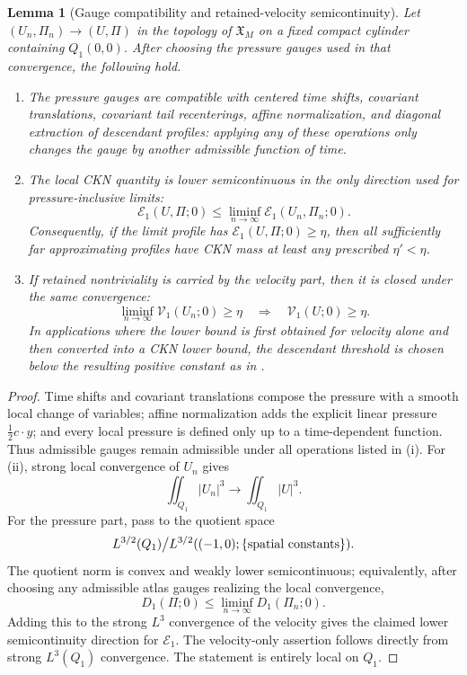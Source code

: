\documentclass[11pt]{amsart}
\numberwithin{equation}{section}
\theoremstyle{plain}
\newtheorem{lemma}[lemma]{Lemma}
\theoremstyle{definition}
\theoremstyle{remark}
\newcommand{\calE}{\mathcal E}
\newcommand{\Vel}{\mathcal V}
\begin{document}
\begin{lemma}[Gauge compatibility and retained-velocity semicontinuity]
\label{lem:gauge-compatibility}
Let \((U_n,\Pi_n)\to(U,\Pi)\) in the topology of
\(\mathfrak X_M\) on a fixed compact cylinder containing \(Q_1(0,0)\).  After
choosing the pressure gauges used in that convergence, the following hold.
\begin{enumerate}[label=\textup{(\roman*)}]
   \item The pressure gauges are compatible with centered time shifts,
   covariant translations, covariant tail recenterings, affine normalization,
   and diagonal extraction of descendant profiles: applying any of these operations only
   changes the gauge by another admissible function of time.
   \item The local CKN quantity is lower semicontinuous in the only direction
   used for pressure-inclusive limits:
   \[
      \calE_1(U,\Pi;0)
      \le
      \liminf_{n\to\infty}\calE_1(U_n,\Pi_n;0).
   \]
   Consequently, if the limit profile has
   \(\calE_1(U,\Pi;0)\ge\eta\), then all sufficiently far approximating
   profiles have CKN mass at least any prescribed \(\eta'<\eta\).
   \item If retained nontriviality is carried by the velocity part, then it is
   closed under the same convergence:
   \[
      \liminf_{n\to\infty}\Vel_1(U_n;0)\ge\eta
      \quad\Longrightarrow\quad
      \Vel_1(U;0)\ge\eta .
   \]
   In applications where the lower bound is first obtained for velocity alone
   and then converted into a CKN lower bound, the descendant threshold is chosen
   below the resulting positive constant as in
   .
\end{enumerate}
\end{lemma}

\begin{proof}
Time shifts and covariant translations compose the pressure with a smooth local
change of variables; affine normalization adds the explicit linear pressure
\(\frac12c\cdot y\); and every local pressure is defined only up to a
time-dependent function.  Thus admissible gauges remain admissible under all
operations listed in (i).  For (ii), strong local convergence of \(U_n\) gives
\[
   \iint_{Q_1}|U_n|^3\to\iint_{Q_1}|U|^3 .
   \]
For the pressure part, pass to the quotient space
\[
   L^{3/2}(Q_1)\big/
   L^{3/2}((-1,0);\{\hbox{spatial constants}\}).
\]
The quotient norm is convex and weakly lower semicontinuous; equivalently,
after choosing any admissible atlas gauges realizing the local convergence,
\[
   D_1(\Pi;0)\le \liminf_{n\to\infty}D_1(\Pi_n;0).
\]
Adding this to the strong \(L^3\) convergence of the velocity gives the claimed
lower semicontinuity direction for \(\calE_1\).  The velocity-only assertion
follows directly from strong \(L^3(Q_1)\) convergence.  The statement is
entirely local on \(Q_1\).
\end{proof}
\end{document}
